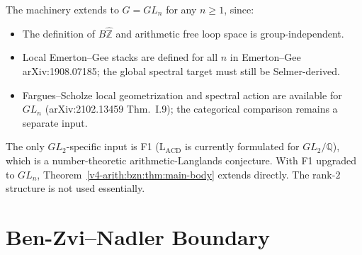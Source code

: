 \begin{remark}[extension to \(GL_{n}\)]
\label{v4-arith:bzn:rem:GLn}
The machinery extends to \(G=GL_{n}\) for any \(n\geq 1\),
since:
\begin{itemize}
\item The definition of \(B\widehat{\mathbb{Z}}\) and arithmetic
free loop space is group-independent.
\item Local Emerton--Gee stacks are defined for all \(n\) in
Emerton--Gee arXiv:1908.07185; the global spectral target must still
be Selmer-derived.
\item Fargues--Scholze local geometrization and spectral action are
available for \(GL_{n}\) (arXiv:2102.13459 Thm.~I.9); the categorical
comparison remains a separate input.
\end{itemize}
The only \(GL_{2}\)-specific input is F1 (\(\mathrm{L}_{\mathrm{ACD}}\)
is currently formulated for \(GL_{2}/\mathbb{Q}\)), which is a
number-theoretic arithmetic-Langlands conjecture. With F1 upgraded
to \(GL_{n}\), Theorem~\ref{v4-arith:bzn:thm:main-body} extends directly.
The rank-\(2\) structure is not used essentially.
\end{remark}

\section{Ben-Zvi--Nadler Boundary}
\label{v4-arith:bzn:summary}

